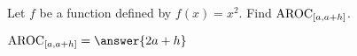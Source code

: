\documentclass{ximera}
\author{Kenneth Berglund}
\begin{document}
\licenseSZ
\begin{exercise}
Let $f$ be a function defined by $f(x) = x^2$. Find $\mathrm{AROC}_{[a, a+h]}$.

$\av_{[a, a+h]} = \answer{2a + h}$

\end{exercise}
\end{document}
